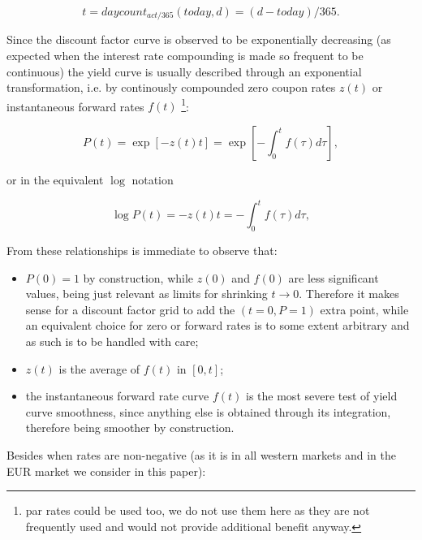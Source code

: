 \documentclass[11pt,reqno]{amsart}
\begin{document}
\begin{equation*}
t=daycount_{act/365}\left( today,d\right) =\left( d-today\right) /365.
\end{equation*}

Since the discount factor curve is observed to be exponentially decreasing
(as expected when the interest rate compounding is made so frequent to be
continuous) the yield curve is usually described through an exponential
transformation, i.e. by continously compounded zero coupon rates $z(t)$ or
instantaneous forward rates $f(t)$ \footnote{%
par rates could be used too, we do not use them here as they are not
frequently used and would not provide additional benefit anyway.}:

\begin{equation}
P(t)=\exp \left[ -z\left( t\right) t\right] =\exp \left[ -\int_{0}^{t}f%
\left( \tau \right) d\tau \right] ,  \label{eqn:relationship}
\end{equation}

or in the equivalent $\log$ notation

\begin{equation}
\log P\left( t\right) =-z\left( t\right) t=-\int_{0}^{t}f(\tau )d\tau ,
\label{eqn:logrelationship}
\end{equation}

From these relationships is immediate to observe that:

\begin{itemize}
\item $P\left( 0\right) =1$ by construction, while $z\left( 0\right) $ and $%
f\left( 0\right) $ are less significant values, being just relevant as
limits for shrinking $t\rightarrow 0$. Therefore it makes sense for a
discount factor grid to add the $\left( t=0,P=1\right) $ extra point, while
an equivalent choice for zero or forward rates is to some extent arbitrary
and as such is to be handled with care;

\item $z\left( t\right) $ is the average of $f\left( t\right) $ in $\left[
0,t\right] $;

\item the instantaneous forward rate curve $f\left( t\right) $ is the most
severe test of yield curve smoothness, since anything else is obtained
through its integration, therefore being smoother by construction.
\end{itemize}

Besides when rates are non-negative (as it is in all western markets and in
the EUR market we consider in this paper):
\end{document}
